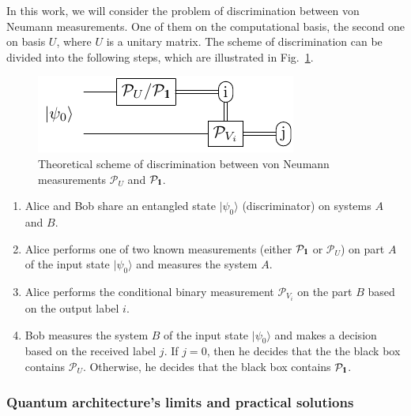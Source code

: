 \documentclass[preprint,12pt, a4paper]{elsarticle}
\newcommand{\ket}[1]{\ensuremath{|#1\rangle}}
\newcommand{\1}{{\rm 1\hspace{-0.9mm}l}}
\newcommand{\Id}{{\rm 1\hspace{-0.9mm}l}}
\newcommand{\PP}{\mathcal{P}}
\begin{document}
In this work, we will consider the problem of discrimination between von Neumann 
measurements. One of them on the computational basis, the second one on basis 
$U$, where $U$ is a unitary matrix. 
The scheme of discrimination can be divided into the following steps, which are 
illustrated in Fig.~\ref{fig:theoretical_scheme}.


\begin{figure}[h!]
	\centering
	\includegraphics[scale=1.7]{pics/theoretical_scheme}
	\caption{Theoretical  scheme of discrimination  between von Neumann measurements $\PP_{U}$ and $\PP_\Id$. }
	\label{fig:theoretical_scheme}
\end{figure}



\begin{enumerate}
	\item Alice and Bob share an entangled state $\ket{\psi_{0}}$ (discriminator) on systems 
	$A$ and $B$.
	\item Alice performs one of two known measurements (either $\PP_{\Id}$ or 
	$\PP_{U}$) on part $A$ of the input state  $\ket{\psi_{0}}$ and measures the system $A$.
	\item Alice performs the conditional binary measurement $\PP_{V_i}$ on the part 
	$B$ based on the output label $i$. 
	\item  Bob measures the system $B$ of the input state  $\ket{\psi_{0}}$ and 
	makes a decision based on the received label $j$. If $j=0$, then he decides 
	that the the black box contains $\PP_U$. Otherwise, he decides that the 
	black box contains $\PP_{\Id}$. 
\end{enumerate}  



\subsubsection{Quantum architecture's limits and practical solutions}
\end{document}
